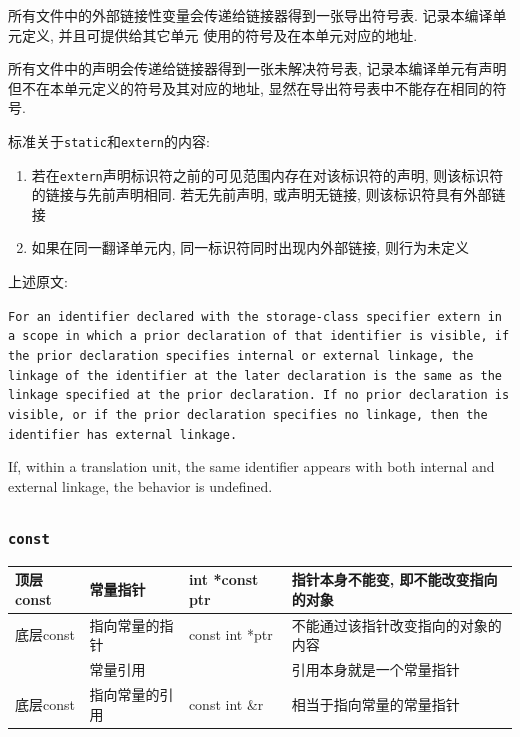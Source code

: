 \vspace{1em}
所有文件中的外部链接性变量会传递给链接器得到一张导出符号表. 记录本编译单元定义, 并且可提供给其它单元
	使用的符号及在本单元对应的地址. 

所有文件中的声明会传递给链接器得到一张未解决符号表, 记录本编译单元有声明但不在本单元定义的符号及其对应的地址, 
	显然在导出符号表中不能存在相同的符号.

标准关于{\tt static}和{\tt extern}的内容:
\begin{enumerate}
	\item 若在{\tt extern}声明标识符之前的可见范围内存在对该标识符的声明, 则该标识符的链接与先前声明相同. 
			若无先前声明, 或声明无链接, 则该标识符具有外部链接
	\item 如果在同一翻译单元内, 同一标识符同时出现内外部链接, 则行为未定义
\end{enumerate}
上述原文:

{\tt For an identifier declared with the storage-class specifier extern in a scope 
in which a prior declaration of that identifier is visible, if the prior 
declaration specifies internal or external linkage, the linkage of the 
identifier at the later declaration is the same as the linkage specified 
at the prior declaration. If no prior declaration is visible, or if the 
prior declaration specifies no linkage, then the identifier has external 
linkage.

If, within a translation unit, the same identifier appears with both internal 
and external linkage, the behavior is undefined.}

\subsection{}
\subsubsection{\tt const}
\begin{center}
	\begin{tabular}[b]{|l|l|l|l|}
		\hline
		顶层const&常量指针&int *const ptr&指针本身不能变, 即不能改变指向的对象\\
		\hline
		底层const&指向常量的指针&const int *ptr&不能通过该指针改变指向的对象的内容\\
		\hline
		&常量引用&&引用本身就是一个常量指针\\
		\hline
		底层const&指向常量的引用&const int \&r&相当于指向常量的常量指针\\
		\hline
	\end{tabular}
\end{center}

